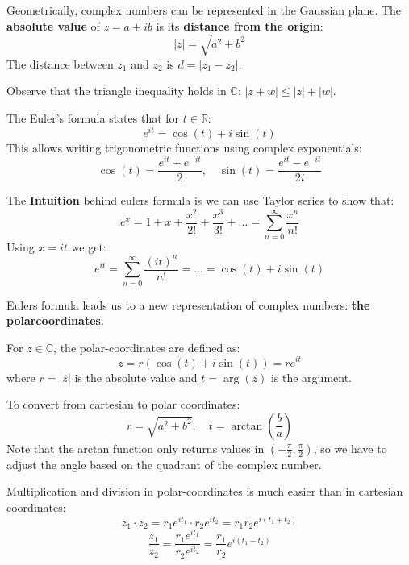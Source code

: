 \begin{definition}
    Geometrically, complex numbers can be represented in the Gaussian plane. The \textbf{absolute value} of $z = a + ib$ is its \textbf{distance from the origin}:
    $$|z| = \sqrt{a^2 + b^2}$$
    The distance between $z_1$ and $z_2$ is $d = |z_1 - z_2|$. 
\end{definition}

\begin{remark}
    Observe that the triangle inequality holds in $\mathbb{C}$: $|z + w| \leq |z| + |w|$.
\end{remark}

\begin{theorem}
    The Euler's formula states that for $t \in \mathbb{R}$:
    $$e^{it} = \cos(t) + i\sin(t)$$
    This allows writing trigonometric functions using complex exponentials:
    $$\cos(t) = \frac{e^{it} + e^{-it}}{2}, \quad \sin(t) = \frac{e^{it} - e^{-it}}{2i}$$
\end{theorem}

\begin{remark}
    The \textbf{Intuition} behind eulers formula is we can use Taylor series to show that:
    $$e^x = 1 + x + \frac{x^2}{2!} + \frac{x^3}{3!} + \dots = \sum_{n=0}^\infty \frac{x^n}{n!}$$
    Using $x=it$ we get:
    $$e^{it} = \sum_{n=0}^\infty \frac{(it)^n}{n!} = \dots = \cos(t) + i\sin(t)$$
\end{remark}

Eulers formula leads us to a new representation of complex numbers: \textbf{the polarcoordinates}.

\begin{definition}
    For $z \in \mathbb{C}$, the polar-coordinates are defined as:
    $$z = r(\cos(t) + i\sin(t)) = r e^{it}$$
    where $r = |z|$ is the absolute value and $t = \arg(z)$ is the argument.
\end{definition}

\begin{remark}
    To convert from cartesian to polar coordinates:
    $$r = \sqrt{a^2 + b^2}, \quad t = \arctan\left(\frac{b}{a}\right)$$
    Note that the arctan function only returns values in $(-\frac{\pi}{2}, \frac{\pi}{2})$, so we have to adjust the angle based on the quadrant of the complex number.
\end{remark}

\begin{example}
    Multiplication and division in polar-coordinates is much easier than in cartesian coordinates:
    $$z_1 \cdot z_2 = r_1 e^{it_1} \cdot r_2 e^{it_2} = r_1 r_2 e^{i(t_1 + t_2)}$$
    $$\frac{z_1}{z_2} = \frac{r_1 e^{it_1}}{r_2 e^{it_2}} = \frac{r_1}{r_2} e^{i(t_1 - t_2)} $$
\end{example}

